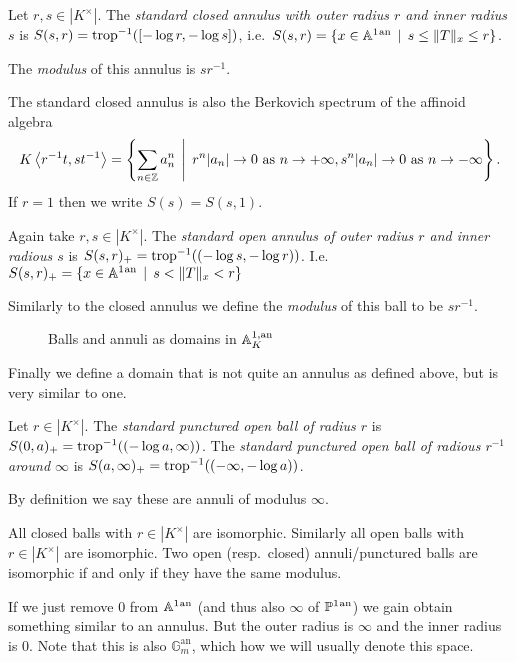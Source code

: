 \begin{definition}
	Let $r, s \in |K^{\times }|$. 
	The \emph{standard closed annulus with outer radius  $r$ and inner radius  $s$}  is $S(s, r) = \operatorname{trop}^{-1}([-\log r, -\log s])$, i.e.\ $S(s, r) = \{x \in \aff^{1}\an \st s \le \|T\|_x \le r\} $.

	The \emph{modulus} of this annulus is $s r^{-1}$. 
\end{definition}
The standard closed annulus is also the Berkovich spectrum of the affinoid algebra \[
	K\left<r^{-1}t, st^{-1} \right> = \left\{\sum_{n \in \Z}^{} a_n ^{n} \st r^{n}|a_n| \to 0 \text{ as } n \to +\infty, s^n |a_n| \to 0 \text{ as } n \to - \infty\right\} 
.\] 
If $r = 1$ then we write $S(s) = S(s,1)$. 
\begin{definition}
	Again take $r, s \in |K^{\times }|$. 
	The \emph{standard open annulus of outer radius $r$ and inner radious $s$} is $S(s,r)_+ = \operatorname{trop}^{-1}((-\log s, -\log r))$. 
	I.e.\ $S(s,r)_+ = \{x \in \aff^{1}\an \st s < \|T\|_x < r\} $

	Similarly to the closed annulus we define the \emph{modulus} of this ball to be $s r^{-1}$. 
\end{definition}

\begin{figure}[ht]
    \centering
    \caption{Balls and annuli as domains in $\mathbb{A}^{1, \text{an}}_K$}
    \label{fig:affine-line-ball-annuli}
\end{figure}

Finally we define a domain that is not quite an annulus as defined above, but is very similar to one. 
\begin{definition}
	Let $r \in |K^{\times }|$. The \emph{standard punctured open ball of radius $r$ } is $S(0, a)_+ = \operatorname{trop}^{-1}((-\log a, \infty))$. 
	The \emph{standard punctured open ball of radious $r^{-1}$ around $\infty$} is $S(a, \infty)_+ = \operatorname{trop}^{-1}((-\infty, -\log a))$. 

	By definition we say these are annuli of modulus $\infty$. 
\end{definition}

All closed balls with $r \in |K^{\times }|$ are isomorphic. Similarly all open balls with $r \in |K^{\times }|$ are isomorphic. 
Two open (resp.\ closed) annuli/punctured balls are isomorphic if and only if they have the same modulus. 

\begin{remark}
	If we just remove $0$ from $\mathbb{A}^{1}{}^{\text{an}}$ (and thus also $\infty$ of $\mathbb{P}^{1}{}^{\text{an}}$) we gain obtain something similar to an annulus. But the outer radius is $\infty$ and the inner radius is $0$. 
	Note that this is also $\mathbb G^{\mathrm{an}}_m$, which how we will usually denote this space. 
\end{remark}



